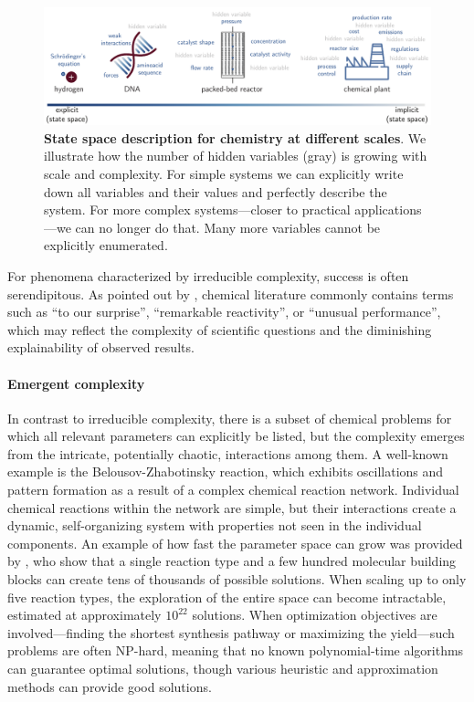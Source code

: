 \begin{figure}[ht]
    \centering
\includegraphics[width=1\textwidth]{figures/rescaled_figures/chemrev_figure1.pdf}   
    \caption{\textbf{State space description for chemistry at different scales}. We illustrate how the number of hidden variables (gray) is growing with scale and complexity. For simple systems we can explicitly write down all variables and their values and perfectly describe the system. For more complex systems---closer to practical applications---we can no longer do that. Many more variables cannot be explicitly enumerated.}
    \label{fig:shape_of_data}
\end{figure}

For phenomena characterized by irreducible complexity, success is often serendipitous. 
As pointed out by \textcite{rulev2017serendipity}, chemical literature commonly contains terms such as \enquote{to our surprise}, \enquote{remarkable reactivity}, or \enquote{unusual performance}, which may reflect the complexity of scientific questions and the diminishing explainability of observed results.

\paragraph{Emergent complexity} In contrast to irreducible complexity, there is a subset of chemical problems for which all relevant parameters can explicitly be listed, but the complexity emerges from the intricate, potentially chaotic, interactions among them. A well-known example is the Belousov-Zhabotinsky reaction, \autocite{Cassani2021BZ} which exhibits oscillations and pattern formation as a result of a complex chemical reaction network. 
Individual chemical reactions within the network are simple, but their interactions create a dynamic, self-organizing system with properties not seen in the individual components.
An example of how fast the parameter space can grow was provided by \textcite{NEURIPS2024_53704142}, who show that a single reaction type and a few hundred molecular building blocks can create tens of thousands of possible solutions. 
When scaling up to only five reaction types, the exploration of the entire space can become intractable, estimated at approximately $10^{22}$ solutions. 
When optimization objectives are involved---finding the shortest synthesis pathway or maximizing the yield---such problems are often NP-hard, meaning that no known polynomial-time algorithms can guarantee optimal solutions, though various heuristic and approximation methods can provide good solutions.

